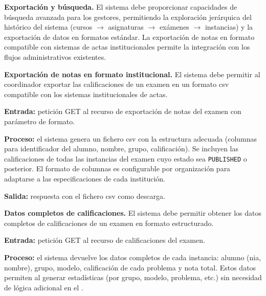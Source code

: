 
\item \textbf{Exportación y búsqueda.} \label{rf:export}
El sistema debe proporcionar capacidades de búsqueda avanzada para los gestores,
permitiendo la exploración jerárquica del histórico del sistema (cursos $\rightarrow$
asignaturas $\rightarrow$ exámenes $\rightarrow$ instancias) y la exportación de datos en
formatos estándar. La exportación de notas en formato compatible con sistemas de actas
institucionales permite la integración con los flujos administrativos existentes.

\begin{functional}

    \item \textbf{Exportación de notas en formato institucional.}
    \label{rf:export:institutional}
    El sistema debe permitir al coordinador exportar las calificaciones de un examen en un
    formato \acs{csv} compatible con los sistemas institucionales de actas.

    \textbf{Entrada:} petición GET al recurso de exportación de notas del examen con
    parámetro de formato.

    \textbf{Proceso:} el sistema genera un fichero \acs{csv} con la estructura adecuada
    (columnas para identificador del alumno, nombre, grupo, calificación). Se incluyen las
    calificaciones de todas las instancias del examen cuyo estado sea \texttt{PUBLISHED} o
    posterior. El formato de columnas es configurable por organización para adaptarse a las
    especificaciones de cada institución.

    \textbf{Salida:} respuesta con el fichero \acs{csv} como descarga.

    \item \textbf{Datos completos de calificaciones.} \label{rf:export:raw}
    El sistema debe permitir obtener los datos completos de calificaciones de un examen en
    formato estructurado.

    \textbf{Entrada:} petición GET al recurso de calificaciones del examen.

    \textbf{Proceso:} el sistema devuelve los datos completos de cada instancia: alumno
    (\acs{nia}, nombre), grupo, modelo, calificación de cada problema y nota total. Estos
    datos permiten al  generar estadísticas (por grupo, modelo, problema,
    etc.) sin necesidad de lógica adicional en el .


\end{functional}

